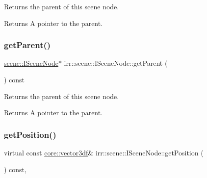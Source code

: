 Returns the parent of this scene node. 

\begin{DoxyReturn}{Returns}
A pointer to the parent. 
\end{DoxyReturn}
\mbox{\label{classirr_1_1scene_1_1ISceneNode_adf77e3715d63e436cc691bf881c4eb5b}} 
\subsubsection{\texorpdfstring{get\+Parent()}{getParent()}\hspace{0.1cm}{\footnotesize\ttfamily [2/2]}}
{\footnotesize\ttfamily \hyperlink{classirr_1_1scene_1_1ISceneNode}{scene\+::\+I\+Scene\+Node}$\ast$ irr\+::scene\+::\+I\+Scene\+Node\+::get\+Parent (\begin{DoxyParamCaption}{ }\end{DoxyParamCaption}) const\hspace{0.3cm}{\ttfamily [inline]}}



Returns the parent of this scene node. 

\begin{DoxyReturn}{Returns}
A pointer to the parent. 
\end{DoxyReturn}
\mbox{\label{classirr_1_1scene_1_1ISceneNode_af5686d35e868e7d295c2d2cb84799d20}} 
\subsubsection{\texorpdfstring{get\+Position()}{getPosition()}\hspace{0.1cm}{\footnotesize\ttfamily [1/2]}}
{\footnotesize\ttfamily virtual const \hyperlink{namespaceirr_1_1core_ae6e2b2a6c552833ebbd5b7463d03586b}{core\+::vector3df}\& irr\+::scene\+::\+I\+Scene\+Node\+::get\+Position (\begin{DoxyParamCaption}{ }\end{DoxyParamCaption}) const\hspace{0.3cm}{\ttfamily [inline]}, {\ttfamily [virtual]}}



